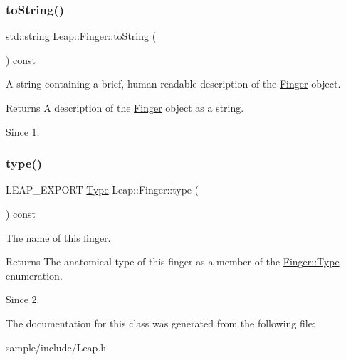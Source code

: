 \subsubsection{\texorpdfstring{to\+String()}{toString()}}
{\footnotesize\ttfamily std\+::string Leap\+::\+Finger\+::to\+String (\begin{DoxyParamCaption}{ }\end{DoxyParamCaption}) const\hspace{0.3cm}{\ttfamily [inline]}}

A string containing a brief, human readable description of the \hyperlink{class_leap_1_1_finger}{Finger} object.


\begin{DoxyCodeInclude}
\end{DoxyCodeInclude}


\begin{DoxyReturn}{Returns}
A description of the \hyperlink{class_leap_1_1_finger}{Finger} object as a string. 
\end{DoxyReturn}
\begin{DoxySince}{Since}
1. 
\end{DoxySince}
\mbox{\label{class_leap_1_1_finger_a1fcede81ae68fa7060eeae5a6961edcc}} 
\subsubsection{\texorpdfstring{type()}{type()}}
{\footnotesize\ttfamily L\+E\+A\+P\+\_\+\+E\+X\+P\+O\+RT \hyperlink{class_leap_1_1_finger_a1e94681e6d2168b2f854fcad7c8ac483}{Type} Leap\+::\+Finger\+::type (\begin{DoxyParamCaption}{ }\end{DoxyParamCaption}) const}

The name of this finger.


\begin{DoxyCodeInclude}
\end{DoxyCodeInclude}


\begin{DoxyReturn}{Returns}
The anatomical type of this finger as a member of the \hyperlink{class_leap_1_1_finger_a1e94681e6d2168b2f854fcad7c8ac483}{Finger\+::\+Type} enumeration. 
\end{DoxyReturn}
\begin{DoxySince}{Since}
2. 
\end{DoxySince}


The documentation for this class was generated from the following file\+:\begin{DoxyCompactItemize}
\item 
sample/include/Leap.\+h\end{DoxyCompactItemize}
